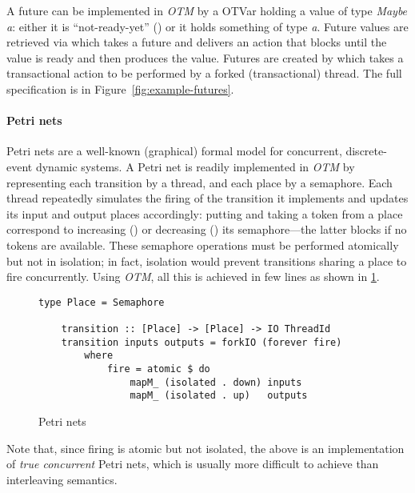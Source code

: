 A future can be implemented in \emph{OTM} by a OTVar
holding a value of type \emph{Maybe a}: either it is
``not-ready-yet'' () or it holds something 
of type \emph{a}.
Future values are retrieved via  which takes 
a future and delivers an action that blocks until the value is
ready and then produces the value.
Futures are created by  which takes a transactional
action to be performed by a forked (transactional) thread. 
The full specification is in Figure~\ref{fig:example-futures}.

\paragraph{Petri nets}
Petri nets are a well-known (graphical) formal model for concurrent, discrete-event dynamic systems.
A Petri net is readily implemented in \emph{OTM} 
by representing each transition by a thread, and each place by a semaphore.
Each thread repeatedly simulates the firing of the transition it 
implements and updates its input and output places accordingly:
putting and taking a token from a place correspond to 
increasing () or decreasing ()
its semaphore---the latter blocks if no tokens are available.
These semaphore operations must be 
performed atomically but not in isolation; in fact, 
isolation would prevent transitions sharing a place to
fire concurrently. 
Using \emph{OTM}, all this is achieved in few lines as shown in \cref{fig:petrinets}.\newpage

\begin{figure}
\begin{Verbatim}[tabsize=3, xleftmargin=1ex, gobble=1]
    type Place = Semaphore
    
    transition :: [Place] -> [Place] -> IO ThreadId
    transition inputs outputs = forkIO (forever fire)
        where 
            fire = atomic $ do
                mapM_ (isolated . down) inputs
                mapM_ (isolated . up)   outputs
\end{Verbatim}
\caption{Petri nets}
\label{fig:petrinets}
\end{figure}

Note that, since firing is atomic but not isolated,
the above is an implementation of \emph{true concurrent} Petri nets, which is usually more difficult to achieve than interleaving semantics.

